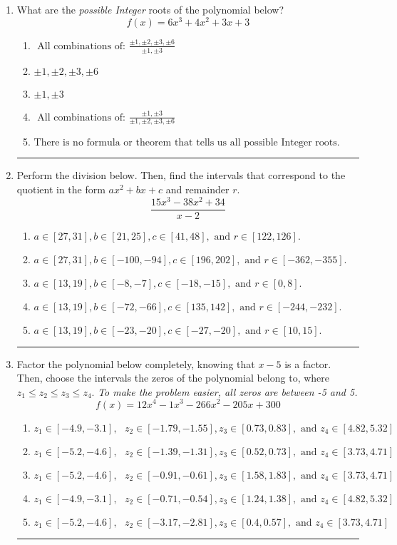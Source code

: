 \documentclass[14pt]{extbook}
\newcommand{\litem}[1]{\item#1\hspace*{-1cm}\rule{\textwidth}{0.4pt}}
\begin{document}
\begin{enumerate}
\litem{
What are the \textit{possible Integer} roots of the polynomial below?\[ f(x) = 6x^{3} +4 x^{2} +3 x + 3 \]\begin{enumerate}[label=\Alph*.]
\item \( \text{ All combinations of: }\frac{\pm 1,\pm 2,\pm 3,\pm 6}{\pm 1,\pm 3} \)
\item \( \pm 1,\pm 2,\pm 3,\pm 6 \)
\item \( \pm 1,\pm 3 \)
\item \( \text{ All combinations of: }\frac{\pm 1,\pm 3}{\pm 1,\pm 2,\pm 3,\pm 6} \)
\item \( \text{There is no formula or theorem that tells us all possible Integer roots.} \)

\end{enumerate} }
\litem{
Perform the division below. Then, find the intervals that correspond to the quotient in the form $ax^2+bx+c$ and remainder $r$.\[ \frac{15x^{3} -38 x^{2} + 34}{x -2} \]\begin{enumerate}[label=\Alph*.]
\item \( a \in [27, 31], b \in [21, 25], c \in [41, 48], \text{ and } r \in [122, 126]. \)
\item \( a \in [27, 31], b \in [-100, -94], c \in [196, 202], \text{ and } r \in [-362, -355]. \)
\item \( a \in [13, 19], b \in [-8, -7], c \in [-18, -15], \text{ and } r \in [0, 8]. \)
\item \( a \in [13, 19], b \in [-72, -66], c \in [135, 142], \text{ and } r \in [-244, -232]. \)
\item \( a \in [13, 19], b \in [-23, -20], c \in [-27, -20], \text{ and } r \in [10, 15]. \)

\end{enumerate} }
\litem{
Factor the polynomial below completely, knowing that $x -5$ is a factor. Then, choose the intervals the zeros of the polynomial belong to, where $z_1 \leq z_2 \leq z_3 \leq z_4$. \textit{To make the problem easier, all zeros are between -5 and 5.}\[ f(x) = 12x^{4} -1 x^{3} -266 x^{2} -205 x + 300 \]\begin{enumerate}[label=\Alph*.]
\item \( z_1 \in [-4.9, -3.1], \text{   }  z_2 \in [-1.79, -1.55], z_3 \in [0.73, 0.83], \text{   and   } z_4 \in [4.82, 5.32] \)
\item \( z_1 \in [-5.2, -4.6], \text{   }  z_2 \in [-1.39, -1.31], z_3 \in [0.52, 0.73], \text{   and   } z_4 \in [3.73, 4.71] \)
\item \( z_1 \in [-5.2, -4.6], \text{   }  z_2 \in [-0.91, -0.61], z_3 \in [1.58, 1.83], \text{   and   } z_4 \in [3.73, 4.71] \)
\item \( z_1 \in [-4.9, -3.1], \text{   }  z_2 \in [-0.71, -0.54], z_3 \in [1.24, 1.38], \text{   and   } z_4 \in [4.82, 5.32] \)
\item \( z_1 \in [-5.2, -4.6], \text{   }  z_2 \in [-3.17, -2.81], z_3 \in [0.4, 0.57], \text{   and   } z_4 \in [3.73, 4.71] \)


\end{enumerate}}
\end{enumerate}
\end{document}
